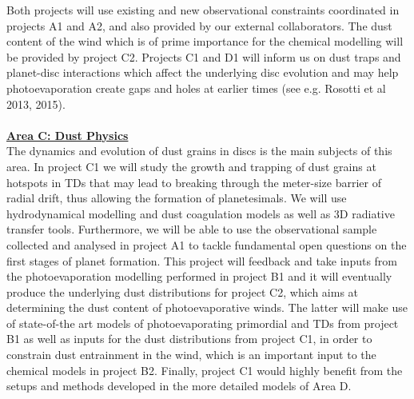 \documentclass[10pt,fleqn,twoside]{article}
\newcommand{\AreacolC}{\color{YellowOrange}}
\begin{document}
Both projects will use existing and new observational
constraints coordinated in projects A1 and A2, and also provided by
our external collaborators. The dust 
content of the wind which is of prime importance for the chemical
modelling will be provided by project C2. Projects C1 and D1 will
inform us on dust traps and 
planet-disc
interactions which affect the underlying disc evolution and may help
photoevaporation create gaps and holes at 
earlier times (see e.g. Rosotti et al 2013, 2015).\\ 

%
\mbox{}\vspace{1em}\\
\noindent\underline{\bf\AreacolC Area C: Dust Physics}\\
\noindent The dynamics and evolution of dust grains in discs is the
main subjects of this area. In project C1 we will study the growth and
trapping of dust grains at hotspots in TDs that may lead
to breaking through the meter-size barrier of radial drift, thus
allowing the formation of planetesimals. We will use hydrodynamical
modelling and dust coagulation models as well as 3D 
radiative transfer tools. Furthermore, we will be able to use the
observational sample collected and analysed in project A1 to tackle
fundamental open questions on the first stages of planet
formation. This project will feedback and take inputs from the
photoevaporation modelling performed in project B1 and it will
eventually produce
the underlying dust distributions for project C2, which aims at
determining the dust content of photoevaporative winds. The latter
will make use of state-of-the art models of photoevaporating
primordial and TDs from project B1 as well as inputs for the dust distributions from
project C1, in order to constrain dust entrainment in the wind, which
is an important input to the chemical models in project B2. Finally,
project C1 would highly benefit from the setups and methods developed
in the more detailed models of Area D.\\ 


\end{document}
